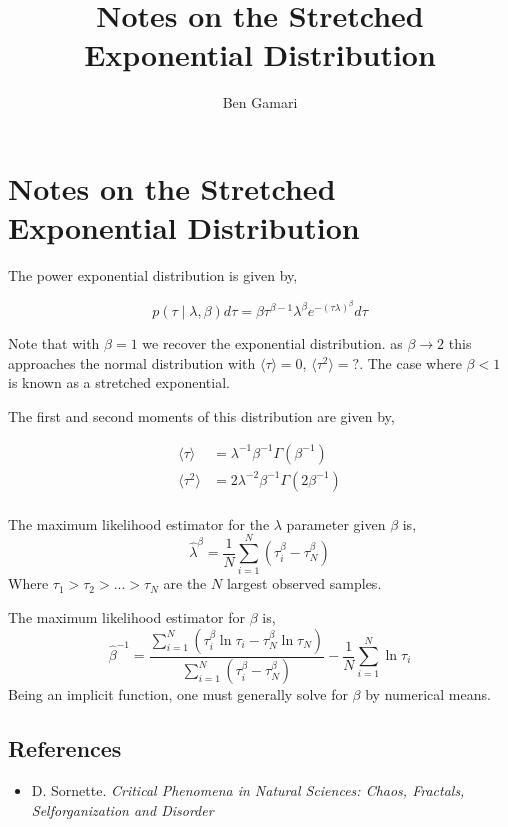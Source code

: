 \documentclass{article}
\title{Notes on the Stretched Exponential Distribution}
\author{Ben Gamari}
\newcommand{\mean}[1]{\ensuremath{\langle #1 \rangle}}
\begin{document}
\section{Notes on the Stretched Exponential Distribution}

The power exponential distribution is given by,

\[ p(\tau \mid \lambda, \beta) d\tau
   = \beta \tau^{\beta-1} \lambda^{\beta} e^{-(\tau \lambda)^\beta} d\tau\]

Note that with $\beta = 1$ we recover the exponential distribution. as
$\beta \rightarrow 2$ this approaches the normal distribution with
$\mean{\tau} = 0$, $\mean{\tau^2} = ?$. The case where $\beta < 1$ is
known as a stretched exponential.

The first and second moments of this distribution are given by,

\begin{align*}
  \mean{\tau} & = \lambda^{-1} \beta^{-1} \Gamma(\beta^{-1}) \\
  \mean{\tau^2} & = 2 \lambda^{-2} \beta^{-1} \Gamma(2\beta^{-1})  \\
\end{align*}

The maximum likelihood estimator for the $\lambda$ parameter given $\beta$ is,
\[ \hat \lambda^\beta = \frac{1}{N} \sum_{i=1}^N (\tau_i^\beta - \tau_N^\beta) \]
Where $\tau_1 > \tau_2 > ... > \tau_N$ are the $N$ largest observed samples.

The maximum likelihood estimator for $\beta$ is,
\[
  \hat\beta^{-1} = \frac{\sum_{i=1}^N (\tau_i^\beta \ln\tau_i -  \tau_N^\beta \ln\tau_N)}
                       {\sum_{i=1}^N (\tau_i^\beta - \tau_N^\beta)}
                  - \frac{1}{N} \sum_{i=1}^N \ln\tau_i
\]
Being an implicit function, one must generally solve for $\beta$ by numerical means.

\subsection{References}
\begin{itemize}
\item D. Sornette. \it{Critical Phenomena in Natural Sciences: Chaos, Fractals, Selforganization and Disorder} 
\end{itemize}
\end{document}
